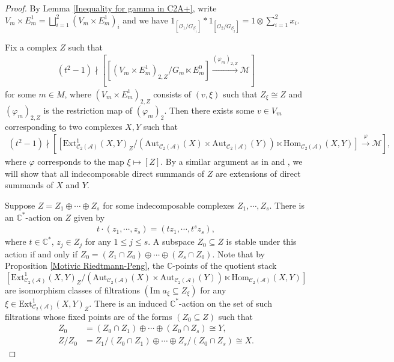 \documentclass[12pt]{amsart}
\theoremstyle{definition}
\numberwithin{equation}{section}
\begin{document}
\begin{proof}
    By Lemma \ref{Inequality for gamma in C2A+}, write $  V_m \times E_m^1 = \bigsqcup_{i=1}^2 (V_m \times E_m^1)_i $ and we have $ 1_{[\mathcal{O}_1/G_{\underline{\beta}_1}]} * 1_{[\mathcal{O}_2/G_{\underline{\beta}_2}]} = 1 \otimes{\sum_{i=1}^2} x_i $.

    Fix a complex $ Z $ such that
    \begin{align*}
        (t^2-1) \nmid [[(V_m \times E_m^1)_{2,Z}/G_m \ltimes E_m^0] \xrightarrow{(\varphi_m)_{2,Z}}\mathcal{M}]
    \end{align*}
    for some $ m \in M $, where $ (V_m \times E_m^1)_{2,Z} $ consists of $ (v,\xi) $ such that $ Z_{\xi} \cong Z $ and $ (\varphi_m)_{2,Z} $  is the restriction map of $ (\varphi_m)_{2} $. 
    Then there exists some $ v \in V_m $ corresponding to two complexes $ X, Y $ such that
    \begin{align*}
        (t^2-1) \nmid [[\mathrm{Ext}^1_{\mathcal{C}_2(\mathcal{A})}(X,Y)_{Z}/(\mathrm{Aut}_{\mathcal{C}_2(\mathcal{A})}(X) \times \mathrm{Aut}_{\mathcal{C}_2(\mathcal{A})}(Y)) \ltimes \mathrm{Hom}_{\mathcal{C}_2(\mathcal{A})}(X,Y)] \xrightarrow{\varphi} \mathcal{M}],
    \end{align*} 
    where $ \varphi $ corresponds to the map $ \xi \mapsto [Z] $. 
    By a similar argument as in \cite[Lemma 2.2]{Riedtmann94} and \cite[Proposition 11]{DXX10}, we will show that all indecomposable direct summands of $ Z $ are extensions of direct summands of $ X $ and $ Y $. 
    
    Suppose $ Z = Z_1 \oplus \cdots \oplus Z_s $ for some indecomposable complexes $ Z_1, \cdots, Z_s $. 
    There is an $ \mathbb{C}^* $-action on $ Z $ given by
    \begin{align*}
        t \cdot (z_1, \cdots, z_s) = (tz_1, \cdots,t^sz_s),
    \end{align*}
    where $ t \in \mathbb{C}^* $, $ z_j \in Z_j$ for any $ 1 \leqslant j \leqslant s $. 
    A subspace $ Z_0 \subseteq Z $ is stable under this action if and only if $ Z_0 = (Z_1 \cap Z_0) \oplus \cdots \oplus (Z_s \cap Z_0) $. 
    Note that by Proposition \ref{Motivic Riedtmann-Peng}, the $ \mathbb{C} $-points of the quotient stack
    \[[\mathrm{Ext}^1_{\mathcal{C}_2(\mathcal{A})}(X,Y)_{Z}/(\mathrm{Aut}_{\mathcal{C}_2(\mathcal{A})}(X) \times \mathrm{Aut}_{\mathcal{C}_2(\mathcal{A})}(Y)) \ltimes \mathrm{Hom}_{\mathcal{C}_2(\mathcal{A})}(X,Y)]\]
    are isomorphism classes of filtrations $ (\mathrm{Im}\;a_{\xi} \subseteq Z_{\xi}) $ for any $ \xi \in \mathrm{Ext}^1_{\mathcal{C}_2(\mathcal{A})}(X,Y)_{Z} $. 
    There is an induced $ \mathbb{C}^* $-action on the set of such filtrations whose fixed points are of the forms $  (Z_0 \subseteq Z) $
    such that
    \begin{align*}
        Z_0 &= (Z_0 \cap Z_1) \oplus \cdots \oplus  (Z_0 \cap Z_s) \cong Y, \\
        Z/Z_0 &= Z_1/(Z_0 \cap Z_1) \oplus \cdots \oplus Z_s/(Z_0 \cap Z_s) \cong X.
    \end{align*}


\end{proof}
\end{document}
